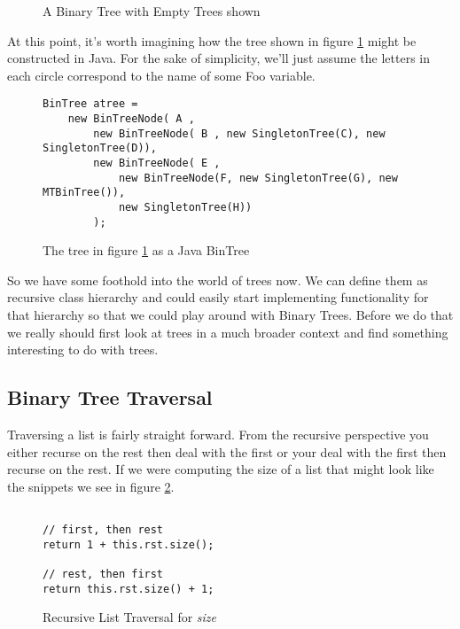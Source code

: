\documentclass[]{tufte-handout}
\begin{document}
\begin{figure}[!htbp]
\caption{A Binary Tree with Empty Trees shown}
\label{fig:bintree3}
\end{figure}

At this point, it's worth imagining how the tree shown in figure \ref{fig:bintree3} might be constructed in Java. For the sake of simplicity, we'll just assume the letters in each circle correspond to the name of some Foo variable.
\begin{figure}[!htpb]
\begin{lstlisting}
BinTree atree = 
	new BinTreeNode( A , 
		new BinTreeNode( B , new SingletonTree(C), new SingletonTree(D)),
		new BinTreeNode( E , 
			new BinTreeNode(F, new SingletonTree(G), new MTBinTree()),
		    new SingletonTree(H))
		); 
\end{lstlisting}
\caption{The tree in figure \ref{fig:bintree3} as a Java BinTree}
\end{figure}

So we have some foothold into the world of trees now. We can define them as recursive class hierarchy and could easily start implementing functionality for that hierarchy so that we could play around with Binary Trees. Before we do that we really should first look at trees in a much broader context and find something interesting to do with trees.

\subsection{Binary Tree Traversal}

Traversing a list is fairly straight forward. From the recursive perspective you either recurse on the rest then deal with the first or your deal with the first then recurse on the rest. If we were computing the size of a list that might look like the snippets we see in figure \ref{fig:lstTrav}. 

\begin{figure}[!htbp]
\begin{lstlisting}

// first, then rest
return 1 + this.rst.size();

// rest, then first
return this.rst.size() + 1;

\end{lstlisting}
\caption{ Recursive List Traversal for \textit{size} }
\label{fig:lstTrav}
\end{figure}
\end{document}
